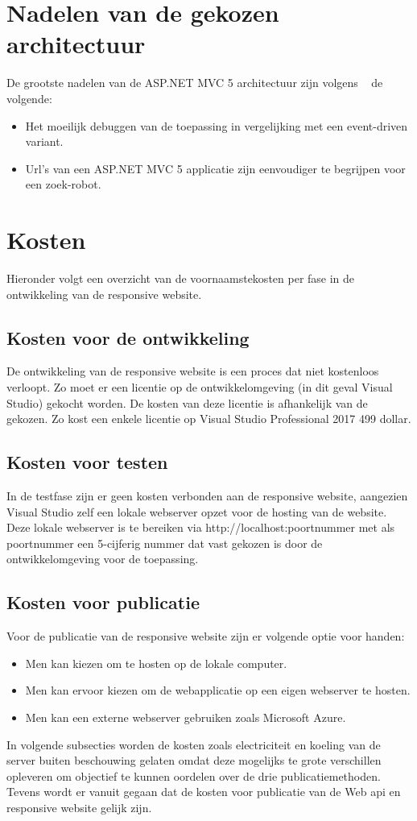 \section{Nadelen van de gekozen architectuur}
De grootste nadelen van de ASP.NET MVC 5 architectuur zijn volgens ~\cite{hasaspnetcorekilledwebforms} de volgende:
\begin{itemize}
  \item Het moeilijk debuggen van de toepassing in vergelijking met een event-driven variant.
  \item Url's van een ASP.NET MVC 5 applicatie zijn eenvoudiger te begrijpen voor een zoek-robot.
\end{itemize}

\section{Kosten}
Hieronder volgt een overzicht van de voornaamstekosten per fase in de ontwikkeling van de responsive website.
\subsection{Kosten voor de ontwikkeling}
De ontwikkeling van de responsive website is een proces dat niet kostenloos verloopt. Zo moet er een licentie op de ontwikkelomgeving (in dit geval Visual Studio) gekocht worden.
De kosten van deze licentie is afhankelijk van de gekozen. Zo kost een enkele licentie op Visual Studio Professional 2017 499 dollar.

\subsection{Kosten voor testen}
In de testfase zijn er geen kosten verbonden aan de responsive website, aangezien Visual Studio zelf een lokale webserver opzet
voor de hosting van de website. Deze lokale webserver is te bereiken via http://localhost:poortnummer met als poortnummer een
5-cijferig nummer dat vast gekozen is door de ontwikkelomgeving voor de toepassing.
\subsection{Kosten voor publicatie}
Voor de publicatie van de responsive website zijn er volgende optie voor handen:
\begin{itemize}
  \item Men kan kiezen om te hosten op de lokale computer.
  \item Men kan ervoor kiezen om de webapplicatie op een eigen webserver te hosten.
  \item Men kan een externe webserver gebruiken zoals Microsoft Azure.
\end{itemize}
In volgende subsecties worden de kosten zoals electriciteit en koeling van de server buiten beschouwing gelaten omdat deze
mogelijks te grote verschillen opleveren om objectief te kunnen oordelen over de drie publicatiemethoden. Tevens wordt er vanuit
gegaan dat de kosten voor publicatie van de Web api en responsive website gelijk zijn.
